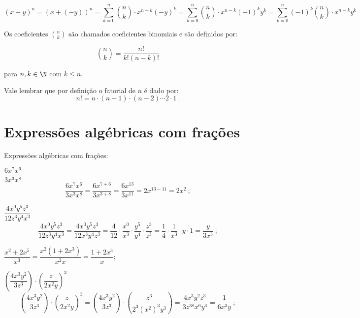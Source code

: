\begin{equation}
(x - y)^n= (x +(-y))^n= \sum^{n}_{k=0} \binom{n}{k} \cdot x^{n-k} (-y)^{k}= \sum^{n}_{k=0} \binom{n}{k} \cdot x^{n-k} (-1)^{k}y^{k}= \sum^{n}_{k=0} (-1)^{k} \binom{n}{k} \cdot x^{n-k} y^{k}
\end{equation}
 
 Os coeficientes $\binom{n}{k}$ são chamados coeficientes binomiais e são definidos por:
 
\begin{equation}
\binom{n}{k}= \frac{n!}{k!(n-k)!}
\end{equation}

 para $n, k \in \N$ com $k \leq n$. 
 
 Vale lembrar que por definição o fatorial de $n$ é dado por:
\begin{equation}
n!= n \cdot (n-1) \cdot (n-2) \cdots 2 \cdot 1 \ .
\end{equation}

 
 \section{Expressões algébricas com frações}
 
 Expressões algébricas com frações:
 \begin{exem}    
  $\dfrac{6x^7 x^6}{3x^3x^8}$
\begin{equation}
\dfrac{6x^7 x^6}{3x^3x^8}= \dfrac{6x^{7+6}}{3x^{3+8}}= \dfrac{6x^{13}}{3x^{11}}= 2x^{13-11}= 2x^2 \ ;
\end{equation}
 \end{exem}
 
 \begin{exem}
  $\dfrac{4x^0y^5z^3}{12z^3y^4x^3}$
\begin{equation}
\dfrac{4x^0y^5z^3}{12z^3y^4x^3}= \dfrac{4x^0y^5z^3}{12x^3y^4z^3}= \dfrac{4}{12} \cdot \dfrac{x^0}{x^3} \cdot \dfrac{y^5}{y^4} \cdot \dfrac{z^3}{z^3}= \dfrac{1}{4} \cdot \dfrac{1}{x^3} \cdot y \cdot 1=\dfrac{y}{3x^3} \ ;
\end{equation}
  \end{exem}
 
 \begin{exem}
  $\dfrac{x^2+2x^5}{x^3}= \dfrac{x^2(1+2x^3)}{x^2 x}= \dfrac{1+2x^3}{x}$;
 \end{exem}
 
 \begin{exem}
  $\left(\dfrac{4x^3y^2}{3z^3}\right) \cdot \left(\dfrac{z}{2x^2y} \right)^3$
\begin{equation}
\left(\dfrac{4x^3y^2}{3z^3}\right) \cdot \left(\dfrac{z}{2x^2y} \right)^3 = \left(\dfrac{4x^3y^2}{3z^3}\right) \cdot \left(\dfrac{z^3}{2^3(x^2)^3y^3} \right)= \dfrac{4x^3y^2z^3}{3z^38x^6y^3}= \dfrac{1}{6x^3y} \ ;
\end{equation}
  \end{exem}
 
